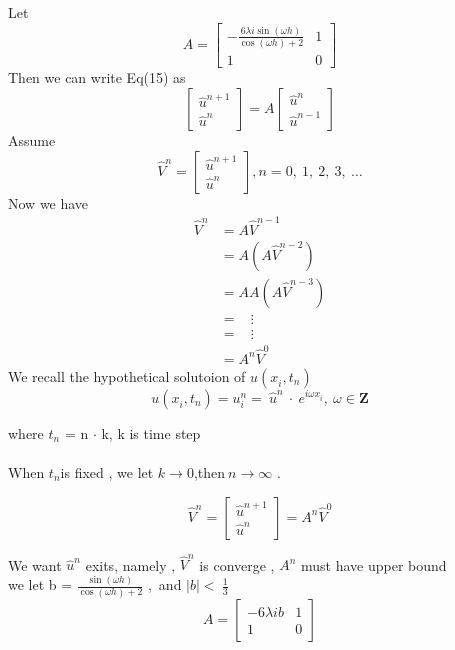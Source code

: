 \documentclass{report}
\begin{document}
Let 
\begin{displaymath}
A =
\left[
\begin{matrix}
 -\frac{6\lambda i \sin (\omega h)}{\cos(\omega h) + 2}& 1
\\
1  & 0
\end{matrix}
\right]
\end{displaymath}
Then we can write Eq(15) as
\begin{equation}
\left[
\begin{matrix}
\hat{u}^{n+1} 
\\
\hat{u}^{n} 
\end{matrix}
\right]
=
A
%
\left[
\begin{matrix}
\hat{u}^{n} 
\\
\hat{u}^{n-1} 
\end{matrix}
\right]
\end{equation}
Assume 
\begin{displaymath}
\hat{V}^n =
\left[
\begin{matrix}
\hat{u}^{n+1} 
\\
\hat{u}^{n} 
\end{matrix}
\right]
, n =0,\  1,\ 2,\ 3,\ \dots
\end{displaymath}
Now we have
\begin{align*}
\hat{V}^n & =A\hat{V}^{n-1}\\
&= A(A\hat{V}^{n-2})\\
& = AA(A\hat{V}^{n-3})\\
& = \ \ \ \ \vdots\\
& = \ \ \ \ \vdots\\
& = A^n\hat{V}^{0}
\end{align*}
\newpage
We recall the hypothetical solutoion of $u(x^{}_{i},t^{}_{n})$
\begin{displaymath}
u(x^{}_{i},t^{}_{n}) = u^{n}_{i} =\ \hat{u}^n\ \cdot \ e^{i \omega x^{}_{i}} ,\  \omega \in \textbf{Z} 
\end{displaymath}

where  $t^{}_{n}$ = n $\cdot$ k, k is time step\\
\\
When $t^{}_{n} $is fixed , we let $k \rightarrow 0$,then$\ n \rightarrow \infty$ .

\begin{displaymath}
\hat{V}^n =
\left[
\begin{matrix}
\hat{u}^{n+1} 
\\
\hat{u}^{n} 
\end{matrix}
\right]
= A^n\hat{V}^{0}
\end{displaymath}

We want $\hat{u}^{n}$ exits, namely , $\hat{V}^n$ is converge ,
$A^{n}$ must have upper bound
\\
we let b = $\frac{\sin (\omega h)}{\cos(\omega h) + 2}$ ,\ and $\vert b\vert <\ \frac{1}{3} $
\\

\begin{displaymath}
A =
\left[
\begin{matrix}
 -6\lambda i b& 1
\\
1  & 0
\end{matrix}
\right]
\end{displaymath}
\end{document}
